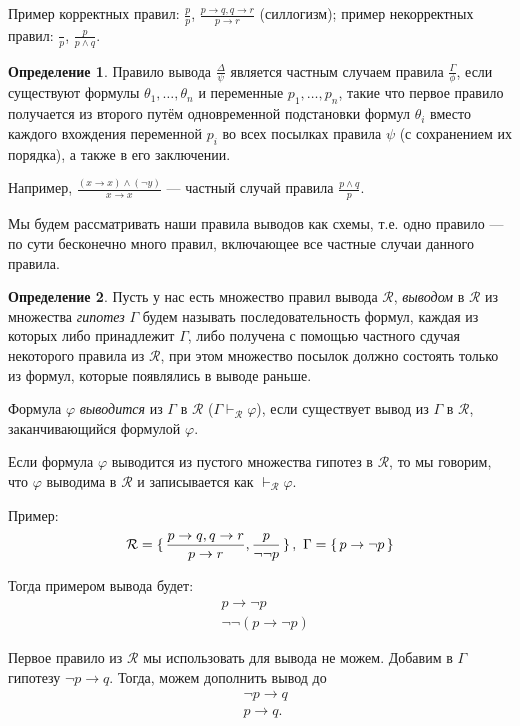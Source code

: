 \documentclass[12pt]{article}
\let\im\rightarrow
\let\n\neg
\let\ds\displaystyle
\theoremstyle{definition}
\newtheorem{definition}{Определение}[section]
\theoremstyle{plain}
\theoremstyle{remark}
\begin{document}
Пример корректных правил: $\ds \frac{p}{p}$, $\ds \frac{p \im q, q
\im r}{p \im r}$ (силлогизм); пример некорректных правил: $\ds
\frac{}{p}$, $\ds \frac{p}{p \land q}$.

\begin{definition}
  Правило вывода $\ds\frac{\Delta}{\psi}$ является частным случаем
  правила $\ds\frac{\Gamma}{\phi}$, если существуют формулы $\theta_1,
  \dots, \theta_n$ и переменные $p_1, \dots, p_n$, такие что первое
  правило получается из второго путём одновременной подстановки
  формул $\theta_i$ вместо каждого вхождения переменной $p_i$ во всех
  посылках правила $\psi$ (с сохранением их порядка), а также в его заключении.
\end{definition}

Например, $\ds\frac{(x \im x) \land (\n y)}{x \im x}$ --- частный
случай правила $\ds\frac{p \land q}{p}$.

Мы будем рассматривать наши правила выводов как схемы, т.е. одно
правило --- по сути бесконечно много правил, включающее все частные
случаи данного правила.

\begin{definition}
  Пусть у нас есть множество правил вывода $\mathcal{R}$,
  \textit{выводом} в $\mathcal{R}$ из множества \textit{гипотез}
  $\Gamma$ будем называть последовательность формул, каждая из
  которых либо принадлежит $\Gamma$, либо получена с помощью частного
  сдучая некоторого правила из $\mathcal{R}$, при этом множество
  посылок должно состоять только из формул, которые появлялись в выводе раньше.

  Формула $\varphi$ \textit{выводится} из $\Gamma$ в $\mathcal{R}$
  ($\Gamma \vdash_{\mathcal{R}} \varphi$), если существует вывод из
  $\Gamma$ в $\mathcal{R}$, заканчивающийся формулой $\varphi$.

  Если формула $\varphi$ выводится из пустого множества гипотез в
  $\mathcal{R}$, то мы говорим, что $\varphi$ выводима в
  $\mathcal{R}$ и записывается как $\vdash_{\mathcal{R}} \varphi$.
\end{definition}

Пример:
\[
  \mathcal{R} = \set{\frac{p \im q, q \im r}{p \im r}, \frac{p}{\n\n
  p}},\ \Gamma = \set{p \im \n p}
\]

Тогда примером вывода будет:
\begin{align*}
  &p \im \n p\\
  &\n\n(p \im \n p)
\end{align*}

Первое правило из $\mathcal{R}$ мы использовать для вывода не можем.
Добавим в $\Gamma$ гипотезу $\n p \im q$. Тогда, можем дополнить вывод до
\begin{align*}
  &\n p \im q\\
  &p \im q.
\end{align*}
\end{document}
